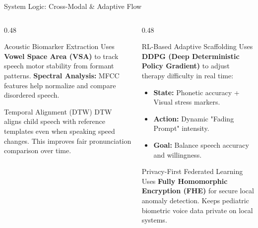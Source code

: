 \documentclass[aspectratio=169, 11pt]{beamer}
\begin{document}
\begin{frame}{System Logic: Cross-Modal \& Adaptive Flow}
    \begin{columns}[T]
        \begin{column}{0.48\textwidth}
            \begin{block}{Acoustic Biomarker Extraction}
                \scriptsize
                Uses \textbf{Vowel Space Area (VSA)} to track speech motor stability from formant patterns.
                \textbf{Spectral Analysis:} MFCC features help normalize and compare disordered speech.
            \end{block}
            
            \begin{block}{Temporal Alignment (DTW)}
                \scriptsize
                DTW aligns child speech with reference templates even when speaking speed changes.
                This improves fair pronunciation comparison over time.
            \end{block}
        \end{column}

        \begin{column}{0.48\textwidth}
            \begin{block}{RL-Based Adaptive Scaffolding}
                \scriptsize
                Uses \textbf{DDPG (Deep Deterministic Policy Gradient)} to adjust therapy difficulty in real time:
                \begin{itemize}
                    \item \textbf{State:} Phonetic accuracy + Visual stress markers.
                    \item \textbf{Action:} Dynamic "Fading Prompt" intensity.
                    \item \textbf{Goal:} Balance speech accuracy and willingness.
                \end{itemize}
            \end{block}

            \begin{block}{Privacy-First Federated Learning}
                \scriptsize
                Uses \textbf{Fully Homomorphic Encryption (FHE)} for secure local anomaly detection.
                Keeps pediatric biometric voice data private on local systems.
            \end{block}
        \end{column}
    \end{columns}
\end{frame}
\end{document}
